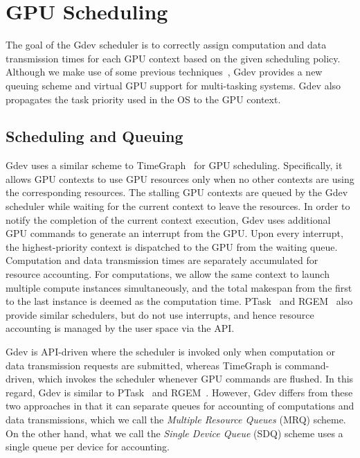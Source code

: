 \vspace{-0.25em}
\section{GPU Scheduling}
\label{sec:scheduling}
\vspace{-0.25em}

The goal of the Gdev scheduler is to correctly assign computation and
data transmission times for each GPU context based on the given
scheduling policy.
Although we make use of some previous
techniques~\cite{Kato_RTSS11,Kato_ATC11}, Gdev provides a new queuing
scheme and virtual GPU support for multi-tasking systems.
Gdev also propagates the task priority used in the OS to the GPU context.

\vspace{-0.25em}
\subsection{Scheduling and Queuing}
\label{sec:scheduling_queueing}
\vspace{-0.25em}

Gdev uses a similar scheme to TimeGraph~\cite{Kato_ATC11} for GPU
scheduling.
Specifically, it allows GPU contexts to use GPU resources only when no
other contexts are using the corresponding resources.
The stalling GPU contexts are queued by the Gdev scheduler while waiting for
the current context to leave the resources.
In order to notify the completion of the current context execution, Gdev
uses additional GPU commands to generate an interrupt from the GPU.
Upon every interrupt, the highest-priority context is dispatched to the
GPU from the waiting queue.
Computation and data transmission times are separately accumulated for
resource accounting.
For computations, we allow the same context to launch multiple
compute instances simultaneously, and the total makespan from the first
to the last instance is deemed as the computation time.
PTask~\cite{Rossbach_SOSP11} and RGEM~\cite{Kato_RTSS11} also provide
similar schedulers, but do not use interrupts, and hence resource accounting is
managed by the user space via the API.

Gdev is API-driven where the scheduler is invoked only when computation or
data transmission requests are submitted, whereas TimeGraph is
command-driven, which invokes the scheduler whenever GPU commands are
flushed.
In this regard, Gdev is similar to PTask~\cite{Rossbach_SOSP11} and
RGEM~\cite{Kato_RTSS11}.
However, Gdev differs from these two approaches in that it can separate
queues for accounting of computations and data transmissions, which we
call the \textit{Multiple Resource Queues} (MRQ) scheme.
On the other hand, what we call the \textit{Single Device Queue} (SDQ)
scheme uses a single queue per device for accounting.

